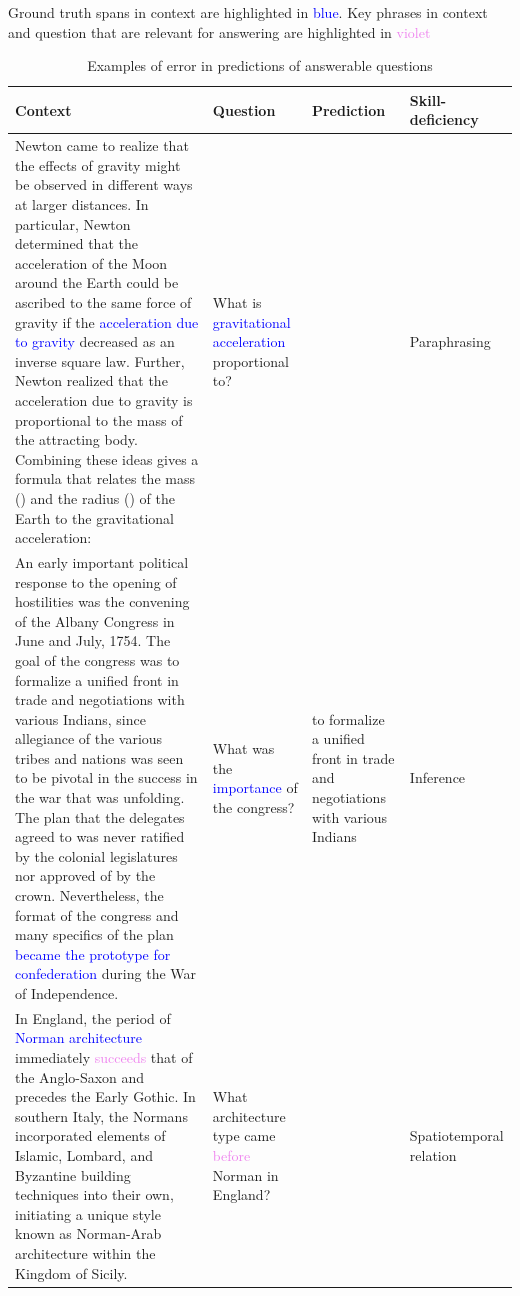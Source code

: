 \documentclass{article}
\begin{document}
\begin{table}[htbp]
\tiny
\caption{Examples of error in predictions of answerable questions}
\label{error-types-table}
\tiny Ground truth spans in context are highlighted in \textcolor{blue}{blue}. Key phrases in context and question that are relevant for answering are highlighted in \textcolor{violet}{violet}
\centering
\begin{tabular}
{p{}
p{}
p{}
p{}} \\ \toprule

Context 
& Question 
& Prediction 
& Skill-deficiency \\ \midrule

Newton came to realize that the effects of gravity might be observed in different ways at larger distances. In particular, Newton determined that the acceleration of the Moon around the Earth could be ascribed to the same force of gravity if the \textcolor{blue}{acceleration due to gravity} decreased as an inverse square law. Further, Newton realized that the acceleration due to gravity is proportional to the mass of the attracting body. Combining these ideas gives a formula that relates the mass () and the radius () of the Earth to the gravitational acceleration: 
& What is  \textcolor{blue}{gravitational acceleration} proportional to? &  & Paraphrasing \\

An early important political response to the opening of hostilities was the convening of the Albany Congress in June and July, 1754. The goal of the congress was to formalize a unified front in trade and negotiations with various Indians, since allegiance of the various tribes and nations was seen to be pivotal in the success in the war that was unfolding. The plan that the delegates agreed to was never ratified by the colonial legislatures nor approved of by the crown. Nevertheless, the format of the congress and many specifics of the plan \textcolor{blue}{became the prototype for confederation} during the War of Independence. & What was the \textcolor{blue}{importance} of the congress? & to formalize a unified front in trade and negotiations with various Indians & Inference  \\

In England, the period of \textcolor{blue}{Norman architecture} immediately \textcolor{violet}{succeeds} that of the Anglo-Saxon and precedes the Early Gothic. In southern Italy, the Normans incorporated elements of Islamic, Lombard, and Byzantine building techniques into their own, initiating a unique style known as Norman-Arab architecture within the Kingdom of Sicily. & What architecture type came \textcolor{violet}{before} Norman in England? &  & Spatiotemporal relation  \\ 


\end{tabular}
\end{table}
\end{document}

